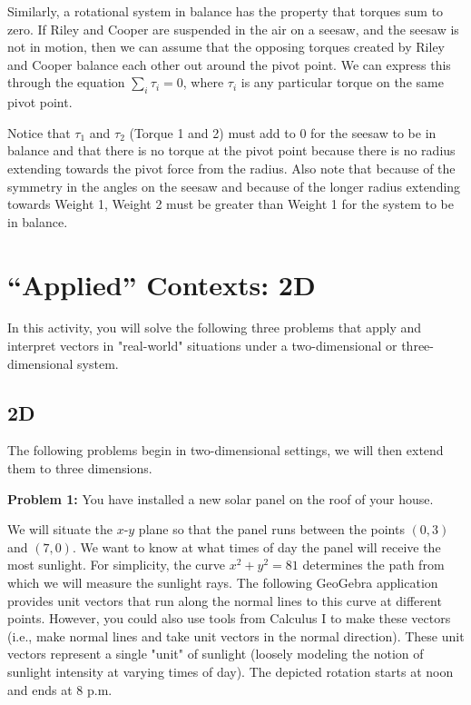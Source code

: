 \documentclass{ximera}
\begin{document}

Similarly, a rotational system in balance has the property that torques sum to zero. If Riley and Cooper are suspended in the air on a seesaw, and the seesaw is not in motion, then we can assume that the opposing torques created by Riley and Cooper balance each other out around the pivot point. We can express this through the equation $\sum_i\tau_i=0$, where $\tau_i$ is any particular torque on the same pivot point.


Notice that $\tau_1$ and $\tau_2$ (Torque 1 and 2) must add to 0 for the seesaw to be in balance and that there is no torque at the pivot point because there is no radius extending towards the pivot force from the radius. Also note that because of the symmetry in the angles on the seesaw and because of the longer radius extending towards Weight 1, Weight 2 must be greater than Weight 1 for the system to be in balance.

\section{``Applied'' Contexts: 2D}

In this activity, you will solve the following three problems that apply and interpret vectors in "real-world" situations under a two-dimensional or three-dimensional system.

\subsection{2D}

The following problems begin in two-dimensional settings, we will then extend them to three dimensions.


\textbf{Problem 1:} You have installed a new solar panel on the roof of your house.

We will situate the $x$-$y$ plane so that the panel runs between the points $(0,3)$ and $(7,0)$. We want to know at what times of day the panel will receive the most sunlight. For simplicity, the curve $x^2+y^2=81$ determines the path from which we will measure the sunlight rays. The following GeoGebra application provides unit vectors that run along the normal lines to this curve at different points. However, you could also use tools from Calculus I to make these vectors (i.e., make normal lines and take unit vectors in the normal direction). These unit vectors represent a single "unit" of sunlight (loosely modeling the notion of sunlight intensity at varying times of day). The depicted rotation starts at noon and ends at 8 p.m.
\end{document}
